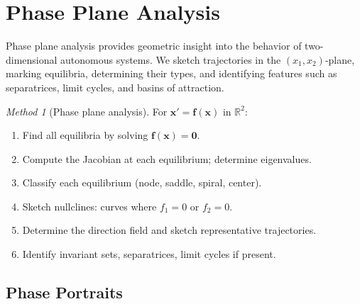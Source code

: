 \documentclass[12pt,a4paper,openany]{book}
\theoremstyle{definition}
\theoremstyle{plain}
\theoremstyle{remark}
\newtheorem{method}[definition]{Method}
\newcommand{\R}{\mathbb{R}}
\begin{document}
\section{Phase Plane Analysis}
\label{sec:phase-plane}

Phase plane analysis provides geometric insight into the behavior of
two-dimensional autonomous systems. We sketch trajectories in the
\((x_1,x_2)\)-plane, marking equilibria, determining their types, and
identifying features such as separatrices, limit cycles, and basins of
attraction.

\begin{method}[Phase plane analysis]
\label{meth:phase-plane}
For \(\mathbf{x}'=\mathbf{f}(\mathbf{x})\) in \(\R^2\):
\begin{enumerate}[label=\textbf{Step~\arabic*.}]
  \item Find all equilibria by solving \(\mathbf{f}(\mathbf{x})=\mathbf{0}\).
  \item Compute the Jacobian at each equilibrium; determine eigenvalues.
  \item Classify each equilibrium (node, saddle, spiral, center).
  \item Sketch nullclines: curves where \(f_1=0\) or \(f_2=0\).
  \item Determine the direction field and sketch representative trajectories.
  \item Identify invariant sets, separatrices, limit cycles if present.
\end{enumerate}
\end{method}

\subsection{Phase Portraits}
\label{subsec:phase-portraits}
\end{document}
